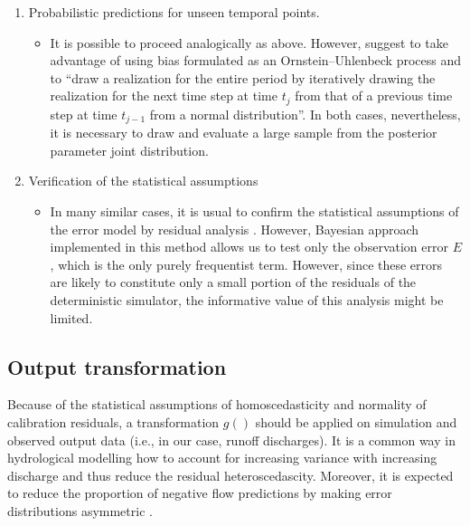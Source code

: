 \documentclass{ctuthesis}\usepackage[]{graphicx}\usepackage[]{color}
\begin{document}
\begin{enumerate}
	\item  Probabilistic predictions for unseen temporal points.
	\begin{itemize}
                \item 	It is possible to proceed analogically as above. However, \cite{giudice2013improving} suggest to take advantage of using bias formulated as an  Ornstein–Uhlenbeck process and to \enquote{draw a realization for the entire period by iteratively drawing the realization for the next time step at time   $t_ j$ from that of a previous time step at time $t_ {j-1}$ from a normal distribution}. In both cases, nevertheless, it is necessary to draw and evaluate a large sample from the  posterior parameter joint distribution.
        \end{itemize}
	
	\item Verification of the statistical assumptions
	\begin{itemize}
                \item 	In many similar cases, it is usual to confirm the statistical assumptions of the error model by residual analysis \citep{reichert2012linking}. However, Bayesian approach implemented in this method allows us to test only the observation error $E$, which is the only purely frequentist term. However, since these errors are likely to constitute only a small portion of the residuals of the deterministic simulator, the informative value of this analysis might be limited.
        \end{itemize}

	
\end{enumerate}






\subsection{Output transformation} \label{transfTheor}

Because of the  statistical assumptions of homoscedasticity and normality of calibration residuals, a transformation $g()$ should be applied on simulation and observed output data (i.e., in our case, runoff discharges).  It is a common way in hydrological modelling how to account for increasing variance with increasing discharge and thus reduce the residual heteroscedascity. Moreover, it is expected to reduce the proportion of negative flow predictions by making error distributions asymmetric \citep{giudice2013improving}.
\end{document}
